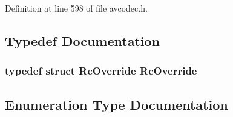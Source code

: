 Definition at line 598 of file avcodec.\+h.



\subsection{Typedef Documentation}
\subsubsection[{\texorpdfstring{Rc\+Override}{RcOverride}}]{\setlength{\rightskip}{0pt plus 5cm}typedef struct {\bf Rc\+Override}  {\bf Rc\+Override}}\hypertarget{group__lavc__encoding_gab1f6225af3457c88da7b862af9873046}{}\label{group__lavc__encoding_gab1f6225af3457c88da7b862af9873046}


\subsection{Enumeration Type Documentation}
